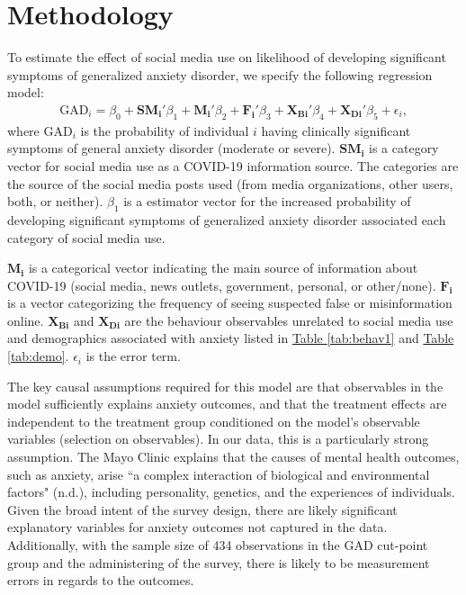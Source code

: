 \documentclass{article}[12pt]
\begin{document}
    \section{Methodology}
        
        To estimate the effect of social media use on likelihood of developing significant symptoms of generalized anxiety disorder, we specify the following regression model:
        \begin{align}
            \text{GAD}_i = \beta_0 + \mathbf{SM_{i}'} \beta_1 + \mathbf{M_i'} \beta_2 + \mathbf{F_i'} \beta_3 + \mathbf{X_{Bi}'} \beta_4 + \mathbf{X_{Di}'} \beta_5 + \epsilon_i,
        \end{align}
        where GAD$_i$ is the probability of individual $i$ having clinically significant symptoms of general anxiety disorder (moderate or severe). $\mathbf{SM_i}$ is a category vector for social media use as a COVID-19 information source. The categories are the source of the social media posts used (from media organizations, other users, both, or neither). $\beta_1$ is a estimator vector for the increased probability of developing significant symptoms of generalized anxiety disorder associated each category of social media use.
        
        $\mathbf{M_i}$ is a categorical vector indicating the main source of information about COVID-19 (social media, news outlets, government, personal, or other/none). $\mathbf{F_i}$ is a vector categorizing the frequency of seeing suspected false or misinformation online. $\mathbf{X_{Bi}}$ and $\mathbf{X_{Di}}$ are the behaviour observables unrelated to social media use and demographics associated with anxiety listed in \hyperref[tab:behav2]{Table \ref{tab:behav1}} and \hyperref[tab:demo]{Table \ref{tab:demo}}. $\epsilon_i$ is the error term.
        
        The key causal assumptions required for this model are that observables in the model sufficiently explains anxiety outcomes, and that the treatment effects are independent to the treatment group conditioned on the model's observable variables (selection on observables). In our data, this is a particularly strong assumption. The Mayo Clinic explains that the causes of mental health outcomes, such as anxiety, arise ``a complex interaction of biological and environmental factors" (n.d.), including personality, genetics, and the experiences of individuals. Given the broad intent of the survey design, there are likely significant explanatory variables for anxiety outcomes not captured in the data. Additionally, with the sample size of 434 observations in the GAD cut-point group and the administering of the survey, there is likely to be measurement errors in regards to the outcomes.
        
\end{document}

